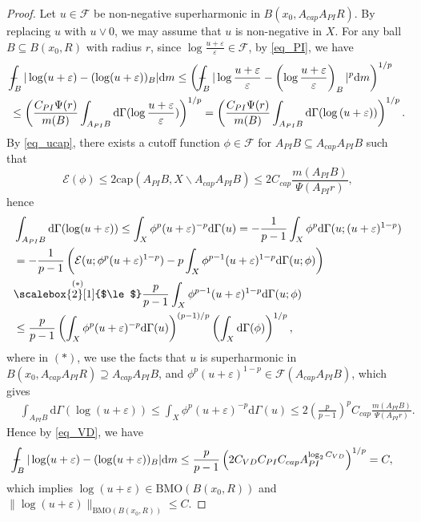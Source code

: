 \documentclass[11pt,a4paper]{article}
\numberwithin{equation}{section}
\def\Xint#1{\mathchoice
{\XXint\displaystyle\textstyle{#1}}%
{\XXint\textstyle\scriptstyle{#1}}%
{\XXint\scriptstyle\scriptscriptstyle{#1}}%
{\XXint\scriptscriptstyle\scriptscriptstyle{#1}}%
\!\int}
\def\XXint#1#2#3{{\setbox0=\hbox{$#1{#2#3}{\int}$ }
\vcenter{\hbox{$#2#3$ }}\kern-.6\wd0}}
\def\dashint{\Xint-}
\theoremstyle{plain}
\theoremstyle{definition}
\begin{document}
\begin{proof}
Let $u\in\mathcal{F}$ be non-negative superharmonic in $B(x_0,A_{cap}A_{PI}R)$. By replacing $u$ with $u\vee 0$, we may assume that $u$ is non-negative in $X$. For any ball $B\subseteq B(x_0,R)$ with radius $r$, since $\log \frac{u+\varepsilon}{\varepsilon}\in\mathcal{F}$, by \ref{eq_PI}, we have
\begin{align*}
&\dashint_B|\log (u+\varepsilon)-(\log (u+\varepsilon))_B|\mathrm{d} m\le \left(\dashint_B|\log \frac{u+\varepsilon}{\varepsilon}-\left(\log \frac{u+\varepsilon}{\varepsilon}\right)_B|^p\mathrm{d} m\right)^{1/p}\\
&\le \left(\frac{C_{PI}\Psi(r)}{m(B)}\int_{A_{PI}B}\mathrm{d}\Gamma(\log \frac{u+\varepsilon}{\varepsilon})\right)^{1/p}=\left(\frac{C_{PI}\Psi(r)}{m(B)}\int_{A_{PI}B}\mathrm{d}\Gamma(\log {(u+\varepsilon)})\right)^{1/p}.
\end{align*}
By \ref{eq_ucap}, there exists a cutoff function $\phi\in\mathcal{F}$ for $A_{PI}B\subseteq A_{cap}A_{PI}B$ such that
$$\mathcal{E}(\phi)\le 2\mathrm{cap}(A_{PI}B,X\backslash A_{cap}A_{PI}B)\le 2C_{cap}\frac{m(A_{PI}B)}{\Psi(A_{PI}r)},$$
hence
\begin{align}
&\int_{A_{PI}B}\mathrm{d}\Gamma(\log (u+\varepsilon))\le\int_{X}\phi^p(u+\varepsilon)^{-p}\mathrm{d}\Gamma(u)=-\frac{1}{p-1}\int_X\phi^p\mathrm{d}\Gamma(u;(u+\varepsilon)^{1-p})\nonumber\\
&=-\frac{1}{p-1}\left(\mathcal{E}(u;\phi^p(u+\varepsilon)^{1-p})-p\int_X\phi^{p-1}(u+\varepsilon)^{1-p}\mathrm{d}\Gamma(u;\phi)\right)\nonumber\\
&\overset{(*)}{\scalebox{2}[1]{$\le$}} \frac{p}{p-1}\int_X\phi^{p-1}(u+\varepsilon)^{1-p}\mathrm{d}\Gamma(u;\phi)\nonumber\\
&\le\frac{p}{p-1}\left(\int_X\phi^p(u+\varepsilon)^{-p}\mathrm{d}\Gamma(u)\right)^{(p-1)/p}\left(\int_X\mathrm{d}\Gamma(\phi)\right)^{1/p},\label{eq_energy_log}
\end{align}
where in $(*)$, we use the facts that $u$ is superharmonic in $B(x_0,A_{cap}A_{PI}R)\supseteq A_{cap}A_{PI}B$, and $\phi^p(u+\varepsilon)^{1-p}\in \mathcal{F}(A_{cap}A_{PI}B)$, which gives
\begin{align*}
&\int_{A_{PI}B}\mathrm{d}\Gamma(\log (u+\varepsilon))\le\int_X\phi^p(u+\varepsilon)^{-p}\mathrm{d}\Gamma(u)\le 2\left(\frac{p}{p-1}\right)^pC_{cap}\frac{m(A_{PI}B)}{\Psi(A_{PI}r)}.
\end{align*}
Hence by \ref{eq_VD}, we have
\begin{align*}
&\dashint_B|\log (u+\varepsilon)-(\log (u+\varepsilon))_B|\mathrm{d} m\le \frac{p}{p-1}\left(2C_{VD}C_{PI}C_{cap}A_{PI}^{\log_2C_{VD}}\right)^{1/p}=C,
\end{align*}
which implies $\log(u+\varepsilon)\in\mathrm{BMO}(B(x_0,R))$ and $\lVert {\log (u+\varepsilon)}\rVert_{\mathrm{BMO}(B(x_0,R))}\le C$.
\end{proof}
\end{document}
